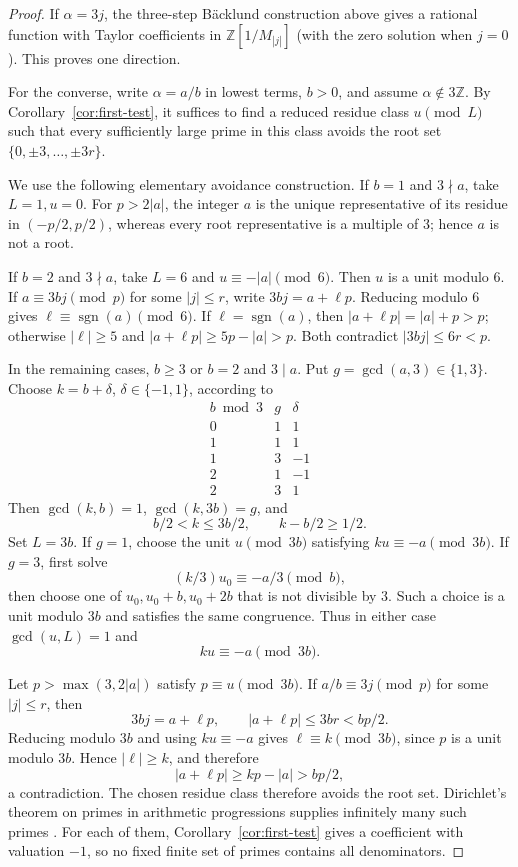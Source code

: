\documentclass[11pt,a4paper,reqno]{amsart}
\theoremstyle{definition}
\theoremstyle{remark}
\newcommand{\Z}{\mathbb Z}
\newcommand{\sgn}{\operatorname{sgn}}
\begin{document}
\begin{proof}
If $\alpha=3j$, the three-step B\"acklund construction above gives a rational function with Taylor coefficients in $\Z[1/M_{|j|}]$ (with the zero solution when $j=0$). This proves one direction.

For the converse, write $\alpha=a/b$ in lowest terms, $b>0$, and assume $\alpha\notin3\Z$. By Corollary~\ref{cor:first-test}, it suffices to find a reduced residue class $u\pmod L$ such that every sufficiently large prime in this class avoids the root set $\{0,\pm3,\ldots,\pm3r\}$.

We use the following elementary avoidance construction. If $b=1$ and $3\nmid a$, take $L=1,u=0$. For $p>2|a|$, the integer $a$ is the unique representative of its residue in $(-p/2,p/2)$, whereas every root representative is a multiple of $3$; hence $a$ is not a root.

If $b=2$ and $3\nmid a$, take $L=6$ and $u\equiv-|a|\pmod6$. Then $u$ is a unit modulo $6$. If $a\equiv3bj\pmod p$ for some $|j|\le r$, write $3bj=a+\ell p$. Reducing modulo $6$ gives $\ell\equiv\sgn(a)\pmod6$. If $\ell=\sgn(a)$, then $|a+\ell p|=|a|+p>p$; otherwise $|\ell|\ge5$ and $|a+\ell p|\ge5p-|a|>p$. Both contradict $|3bj|\le6r<p$.

In the remaining cases, $b\ge3$ or $b=2$ and $3\mid a$. Put $g=\gcd(a,3)\in\{1,3\}$. Choose $k=b+\delta$, $\delta\in\{-1,1\}$, according to
\[
\begin{array}{c|c|c}
 b\bmod3&g&\delta\\\hline
 0&1&1\\
 1&1&1\\
 1&3&-1\\
 2&1&-1\\
 2&3&1
\end{array}
\]
Then $\gcd(k,b)=1$, $\gcd(k,3b)=g$, and
\[
 b/2<k\le3b/2,\qquad k-b/2\ge1/2.
\]
Set $L=3b$. If $g=1$, choose the unit $u\pmod{3b}$ satisfying $ku\equiv-a\pmod{3b}$. If $g=3$, first solve
\[
 (k/3)u_0\equiv-a/3\pmod b,
\]
then choose one of $u_0,u_0+b,u_0+2b$ that is not divisible by $3$. Such a choice is a unit modulo $3b$ and satisfies the same congruence. Thus in either case $\gcd(u,L)=1$ and
\[
 ku\equiv-a\pmod{3b}.
\]

Let $p>\max(3,2|a|)$ satisfy $p\equiv u\pmod{3b}$. If $a/b\equiv3j\pmod p$ for some $|j|\le r$, then
\[
 3bj=a+\ell p,
 \qquad |a+\ell p|\le3br<bp/2.
\]
Reducing modulo $3b$ and using $ku\equiv-a$ gives $\ell\equiv k\pmod{3b}$, since $p$ is a unit modulo $3b$. Hence $|\ell|\ge k$, and therefore
\[
 |a+\ell p|\ge kp-|a|>bp/2,
\]
a contradiction. The chosen residue class therefore avoids the root set. Dirichlet's theorem on primes in arithmetic progressions supplies infinitely many such primes \cite{SutherlandDirichlet}. For each of them, Corollary~\ref{cor:first-test} gives a coefficient with valuation $-1$, so no fixed finite set of primes contains all denominators.
\end{proof}
\end{document}
